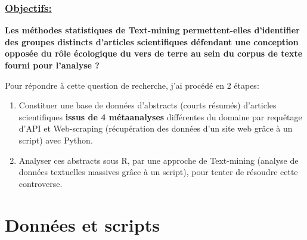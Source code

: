 \documentclass[xcolor=dvipsnames]{beamer}
\begin{document}
	\begin{frame}
		\frametitle{\underline{Objectifs:}}
		\textbf{Les méthodes statistiques de Text-mining permettent-elles d’identifier des
		groupes distincts d’articles scientifiques défendant une conception opposée du
		rôle écologique du vers de terre au sein du corpus de texte fourni pour l’analyse ?}
		
		
		\vspace{\baselineskip}
		Pour répondre à cette question de recherche, j'ai procédé en 2 étapes: 
		\begin{enumerate}
				\item Constituer une base de données d'abstracts (courts résumés) d'articles scientifiques \textbf{issus de 4 métaanalyses} différentes du domaine par requêtage d'API et Web-scraping (récupération des données d'un site web grâce à un script) avec Python.
				\item Analyser ces abstracts sous R, par une approche de Text-mining (analyse de données textuelles massives grâce à un script), pour tenter de résoudre cette controverse.
			\end{enumerate}
	\end{frame}

	\section*{Données et scripts}
\end{document}
